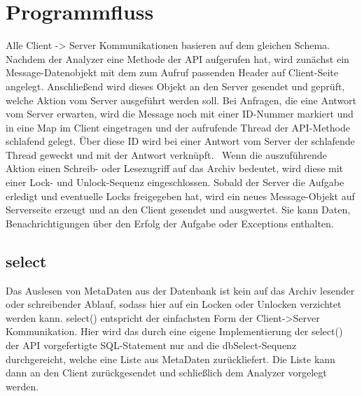 \section{Programmfluss}

Alle Client -> Server Kommunikationen basieren auf dem gleichen Schema.
Nachdem der Analyzer eine Methode der API aufgerufen hat, wird zunächst ein Message-Datenobjekt mit dem zum Aufruf passenden Header auf Client-Seite angelegt.
Anschließend wird dieses Objekt an den Server gesendet und geprüft, welche Aktion vom Server ausgeführt werden soll.
Bei Anfragen, die eine Antwort vom Server erwarten, wird die Message noch mit einer ID-Nummer markiert und in eine Map im Client eingetragen und der aufrufende Thread der API-Methode schlafend gelegt.
Über diese ID wird bei einer Antwort vom Server der schlafende Thread geweckt und mit der Antwort verknüpft.
\
Wenn die auszuführende Aktion einen Schreib- oder Lesezugriff auf das Archiv bedeutet, wird diese mit einer Lock- und Unlock-Sequenz eingeschlossen.
Sobald der Server die Aufgabe erledigt und eventuelle Locks freigegeben hat, wird ein neues Message-Objekt auf Serverseite erzeugt und an den Client gesendet und ausgwertet.
Sie kann Daten, Benachrichtigungen über den Erfolg der Aufgabe oder Exceptions enthalten.

\subsection {select}

Das Auslesen von MetaDaten aus der Datenbank ist kein auf das Archiv lesender oder schreibender Ablauf, sodass hier auf ein Locken oder Unlocken verzichtet werden kann.
select() entspricht der einfachsten Form der Client->Server Kommunikation.
Hier wird das durch eine eigene Implementierung der select() der API vorgefertigte SQL-Statement nur and die dbSelect-Sequenz durchgereicht, welche eine Liste aus MetaDaten zurückliefert.
Die Liste kann dann an den Client zurückgesendet und schließlich dem Analyzer vorgelegt werden.


